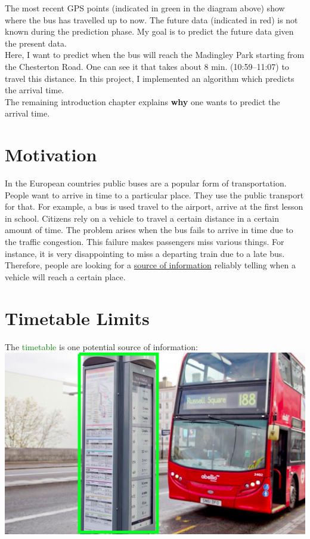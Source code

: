 \documentclass[12pt,a4paper,oneside,openright]{report}
\begin{document}
The most recent GPS points (indicated in green in the diagram above) show
where the bus has travelled up to now. The future data (indicated in red)
is not known during the prediction phase. My goal is to predict the future
data given the present data. \\

Here, I want to predict when the bus will reach the Madingley Park starting from the
Chesterton Road. One can see it that takes about 8 min. (10:59--11:07) to travel this distance.
In this project, I implemented an algorithm which predicts the arrival time. \\

The remaining introduction chapter explains \textbf{why} one wants to predict the arrival time.


\section{Motivation}

In the European countries public buses are a popular form of transportation. People
want to arrive in time to a particular place. They use the public transport for that.
For example, a bus is used travel to the airport, arrive at the first lesson in
school. Citizens rely on a vehicle to travel a certain distance in a certain
amount of time. The problem arises when the bus fails to arrive in time due to the
traffic congestion. This failure makes passengers miss various things. For instance, it
is very disappointing to miss a departing train due to a late bus. Therefore,
people are looking for a \underline{source of information} reliably telling when a
vehicle will reach a certain place. \\

\section{Timetable Limits}

The \textcolor{green}{timetable} is one potential source of information: \\

\includegraphics[width=\textwidth]{figs/timetable_uk.png}
\end{document}
